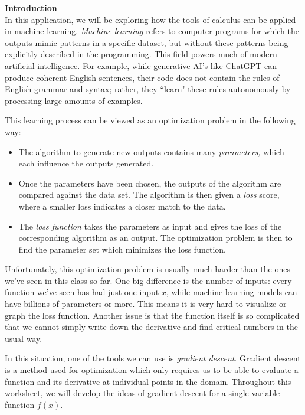 \documentclass[11pt]{article}
\begin{document}



\pagestyle{otherpages}
\thispagestyle{firstpage}
\vspace*{.65in}
{\bf Introduction}\\


In this application, we will be exploring how the tools of calculus can be applied in machine learning. \textit{Machine learning} refers to computer programs for which the outputs mimic patterns in a specific dataset, but without these patterns being explicitly described in the programming. This field powers much of modern artificial intelligence. For example, while generative AI's like ChatGPT can produce coherent English sentences, their code does not contain the rules of English grammar and syntax; rather, they ``learn" these rules autonomously by processing large amounts of examples. 

This learning process can be viewed as an optimization problem in the following way:
\begin{itemize}
    \item The algorithm to generate new outputs contains many \textit{parameters,} which each influence the outputs generated.
    \item Once the parameters have been chosen, the outputs of the algorithm are compared against the data set. The algorithm is then given a \textit{loss} score, where a smaller loss indicates a closer match to the data.
    \item The \textit{loss function} takes the parameters as input and gives the loss of the corresponding algorithm as an output. The optimization problem is then to find the parameter set which minimizes the loss function.
\end{itemize}

Unfortunately, this optimization problem is usually much harder than the ones we've seen in this class so far. One big difference is the number of inputs: every function we've seen has had just one input $x$, while machine learning models can have billions of parameters or more. This means it is very hard to visualize or graph the loss function. Another issue is that the function itself is so complicated that we cannot simply write down the derivative and find critical numbers in the usual way.

In this situation, one of the tools we can use is \textit{gradient descent}. Gradient descent is a method used for optimization which only requires us to be able to evaluate a function and its derivative at individual points in the domain. Throughout this worksheet, we will develop the ideas of gradient descent for a single-variable function $f(x)$.
\end{document}
